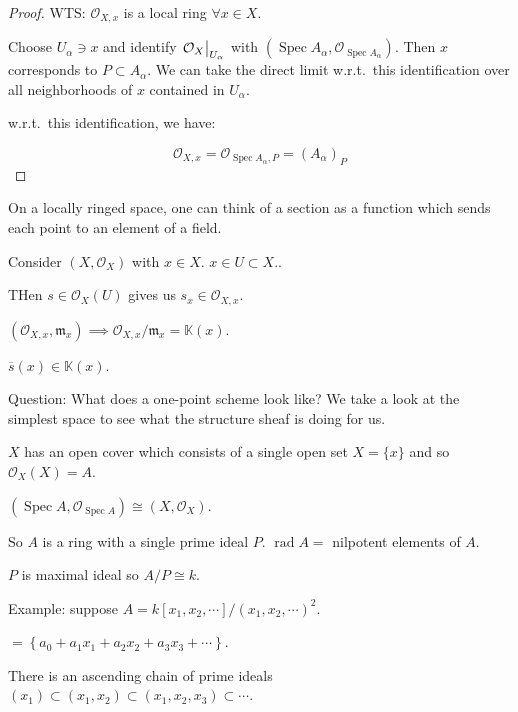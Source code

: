 \documentclass{article}
\theoremstyle{definition}
\begin{document}
    \begin{proof}
        WTS: \(\mathcal{O}_{X,x}\) is a local ring \(\forall x\in X\).

        Choose \(U_\alpha \ni x\) and identify \(\eval{\mathcal{O}_X}_{U_\alpha}\) with \(\left( \operatorname{Spec} A_\alpha , \mathcal{O}_{\operatorname{Spec} A_\alpha} \right) \). Then \(x\) corresponds to \(P \subset A_\alpha\). We can take the direct limit w.r.t.\ this identification over all neighborhoods of \(x\) contained in \(U_\alpha\).

        w.r.t.\ this identification, we have:

        \[
            \mathcal{O}_{X,x} = \mathcal{O}_{\operatorname{Spec} A_\alpha, P} = (A_\alpha)_P
        \]
    \end{proof}

    On a locally ringed space, one can think of a section as a function which sends each point to an element of a field.

    Consider \((X, \mathcal{O}_X)\) with \(x\in X\). \(x\in U \subset X\)..
    
    THen \(s\in \mathcal{O}_X(U)\) gives us \(s_x\in \mathcal{O}_{X,x}\).

    \((\mathcal{O}_{X,x}, \mathfrak{m}_x) \implies \mathcal{O}_{X,x} / \mathfrak{m}_x = \mathbb{K} (x)\).
    
    \(\overline{s}(x) \in \mathbb{K} (x)\).

    Question: What does a one-point scheme look like? We take a look at the simplest space to see what the structure sheaf is doing for us.

    \(X\) has an open cover which consists of a single open set \(X = \{ x \}\) and so \(\mathcal{O}_X(X) = A\).
    
    \((\operatorname{Spec} A, \mathcal{O}_{\operatorname{Spec} A}) \cong (X, \mathcal{O}_X)\).
    
    So \(A\) is a ring with a single prime ideal \(P\). \(\operatorname{rad} A =\) nilpotent elements of \(A\).

    \(P\) is maximal ideal so \(A / P \cong k\).

    Example: suppose \(A = k[x_1, x_2, \cdots] / (x_1, x_2, \cdots)^2\).

    \(= \left\{ a_0 + a_1 x_1 + a_2 x_2 + a_3 x_3 + \cdots  \right\} \).

    There is an ascending chain of prime ideals \((x_1) \subset (x_1, x_2) \subset (x_1, x_2, x_3) \subset \cdots\).
    
\end{document}
